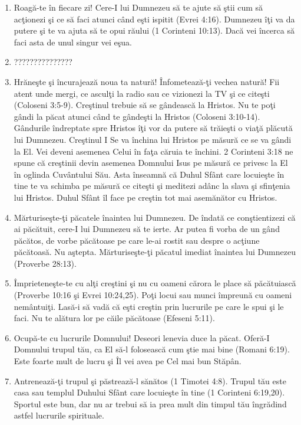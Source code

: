 \begin{enumerate}

	\item Roagă-te în fiecare zi! Cere-I lui Dumnezeu să te ajute să ştii cum să acţionezi şi ce să faci atunci când eşti ispitit (Evrei 4:16). Dumnezeu îţi va da putere şi te va ajuta să te opui răului (1 Corinteni 10:13). Dacă vei încerca să faci asta de unul singur vei eşua. 
	
	\item ???????????????
	
	\item Hrăneşte şi încurajează noua ta natură! Înfometează-ţi vechea natură! Fii atent unde mergi, ce asculţi la radio sau ce vizionezi la TV şi ce citeşti (Coloseni 3:5-9). Creştinul trebuie să se gândească la Hristos. Nu te poţi gândi la păcat atunci când te gândeşti la Hristos (Coloseni 3:10-14). Gândurile îndreptate spre Hristos îţi vor da putere să trăieşti o viaţă plăcută lui Dumnezeu. Creştinul I Se va închina lui Hristos pe măsură ce se va gândi la El. Vei deveni asemenea Celui în faţa căruia te închini. 2 Corinteni 3:18 ne spune că creştinii devin asemenea Domnului Isus pe măsură ce privesc la El în oglinda Cuvântului Său. Asta înseamnă că Duhul Sfânt care locuieşte în tine te va schimba pe măsură ce citeşti şi meditezi adânc la slava şi sfinţenia lui Hristos. Duhul Sfânt îl face pe creştin tot mai asemănător cu Hristos.
	
	\item Mărturiseşte-ţi păcatele înaintea lui Dumnezeu. De îndată ce conştientizezi că ai păcătuit, cere-I lui Dumnezeu să te ierte. Ar putea fi vorba de un gând păcătos, de vorbe păcătoase pe care le-ai rostit sau despre o acţiune păcătoasă. Nu aştepta. Mărturiseşte-ţi păcatul imediat înaintea lui Dumnezeu (Proverbe 28:13).
	
	\item Împrieteneşte-te cu alţi creştini şi nu cu oameni cărora le place să păcătuiască (Proverbe 10:16 şi Evrei 10:24,25). Poţi locui sau munci împreună cu oameni nemântuiţi. Lasă-i să vadă că eşti creştin prin lucrurile pe care le spui şi le faci. Nu te alătura lor pe căile păcătoase (Efeseni 5:11).
	
	\item Ocupă-te cu lucrurile Domnului! Deseori lenevia duce la păcat. Oferă-I Domnului trupul tău, ca El să-l folosească cum ştie mai bine (Romani 6:19). Este foarte mult de lucru şi Îl vei avea pe Cel mai bun Stăpân. 
	
	\item Antrenează-ţi trupul şi păstrează-l sănătos (1 Timotei 4:8). Trupul tău este casa sau templul Duhului Sfânt care locuieşte în tine (1 Corinteni 6:19,20). Sportul este bun, dar nu ar trebui să ia prea mult din timpul tău îngrădind astfel lucrurile spirituale.
\end{enumerate}

